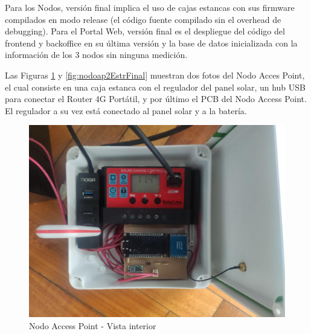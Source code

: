 Para los Nodos, versión final implica el uso de cajas estancas con sus firmware compilados en modo release (el código fuente compilado sin el overhead de debugging).
Para el Portal Web, versión final es el despliegue del código del frontend y backoffice en su última versión y la base de datos inicializada con la información de los 3 nodos sin ninguna medición.

Las Figuras \ref{fig:nodoap1EstrFinal} y \ref{fig:nodoap2EstrFinal} muestran dos fotos del Nodo Acces Point, el cual consiste en una caja estanca con el regulador del panel solar, un hub USB para conectar el Router 4G Portátil, y por último el PCB del Nodo Access Point. El regulador a su vez está conectado al panel solar y a la batería.

\begin{figure}[H]
	\centering
	\includegraphics[scale=0.20]{Figures/Pruebas/nodoap1.jpeg}
	\caption{Nodo Access Point - Vista interior}
	\label{fig:nodoap1EstrFinal}
\end{figure}


